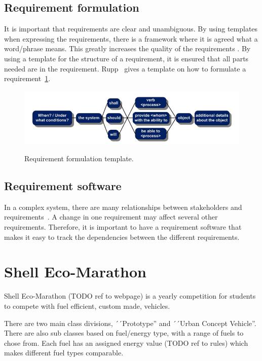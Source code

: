 \subsection{Requirement formulation}
It is important that requirements are clear and unambiguous. By using templates
when expressing the requirements, there is a framework where it is agreed what a
word/phrase means. This greatly increases the quality of the requirements
\cite{rupp2014}. By using a template for the structure of a requirement, it is
ensured that all parts needed are in the requirement. Rupp~\cite{rupp2014}
gives a template on how to formulate a requirement~\ref{fig:req_template}.
\begin{figure}[H]
    \centering
    \includegraphics[width=\textwidth]{./img/introduction_req_template.PNG}\label{fig:req_template}
    \caption{Requirement formulation template.}
\end{figure}
\subsection{Requirement software}
In a complex system, there are many relationships between stakeholders and
requirements~\cite{ibm_req}. A change in one requirement may affect several other
requirements. Therefore, it is important to have a requirement software that
makes it easy to track the dependencies between the different requirements.



\section{Shell Eco-Marathon}
Shell Eco-Marathon (TODO ref to webpage) is a yearly competition for students to compete with fuel efficient, custom made, vehicles.

There are two main class divisions, ´´Prototype'' and ´´Urban Concept
Vehicle''. There are also sub classes based on fuel/energy type, with a range
of fuels to chose from. Each fuel has an assigned energy value (TODO ref to
rules) which makes different fuel types comparable. 

